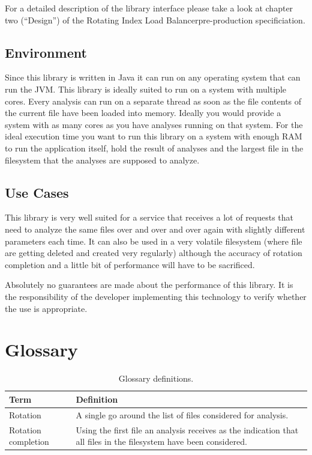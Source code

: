 \documentclass[11pt]{article} %
\newcommand{\rilb}{Rotating Index Load Balancer}
\begin{document}
  For a detailed description of the library interface please take a look at chapter two (``Design'') of the \rilb pre-production specificiation\hyperref[fn:pp-spec]{\footnotemark[1]}.


  \subsection{Environment}\label{sec:3.1}

  Since this library is written in Java it can run on any operating system that can run the JVM. This library is ideally suited to run on a system with multiple cores. Every analysis can run on a separate thread as soon as the file contents of the current file have been loaded into memory. Ideally you would provide a system with as many cores as you have analyses running on that system. For the ideal execution time you want to run this library on a system with enough RAM to run the application itself, hold the result of analyses and the largest file in the filesystem that the analyses are supposed to analyze.


  \subsection{Use Cases}\label{sec:3.2}

  This library is very well suited for a service that receives a lot of requests that need to analyze the same files over and over and over again with slightly different parameters each time. It can also be used in a very volatile filesystem (where file are getting deleted and created very regularly) although the accuracy of rotation completion and a little bit of performance will have to be sacrificed.

  Absolutely no guarantees are made about the performance of this library. It is the responsibility of the developer implementing this technology to verify whether the use is appropriate.



  \newpage



  \section{Glossary}

  \begin{table}[H]
    \centering
    \begin{tabular}{p{.3\linewidth} | p{.6\linewidth}}
      \textbf{Term} & \textbf{Definition}
      \\\hline
      Rotation            & A single go around the list of files considered for analysis.                                                      \\\hline
      Rotation completion & Using the first file an analysis receives as the indication that all files in the filesystem have been considered.
    \end{tabular}
    \caption{Glossary definitions.}
    \label{tab:glossary}
  \end{table}

  \printbibliography[heading=bibintoc]
  \listoffigures
  \listoftables
\end{document}

